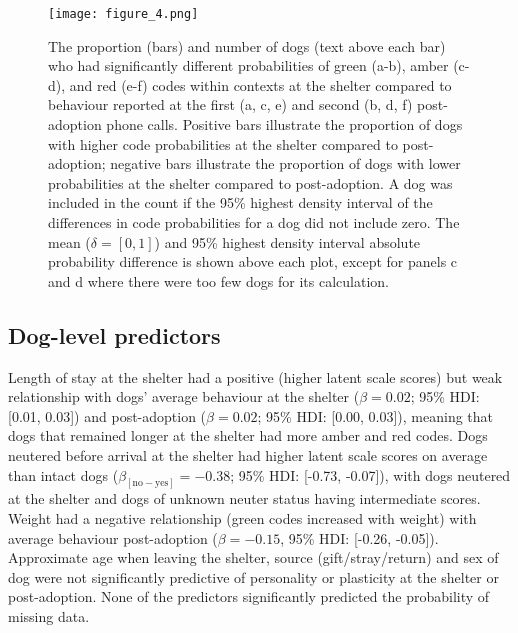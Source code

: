 \documentclass[fleqn,10pt]{wlscirep}
\begin{document}
\begin{figure}[t!]
  \centering
  \texttt{[image: figure\_4.png]}
  \caption{The proportion (bars) and number of dogs (text above each bar) who had significantly different probabilities of green (a-b), amber (c-d), and red (e-f) codes within contexts at the shelter compared to behaviour reported at the first (a, c, e) and second (b, d, f) post-adoption phone calls. Positive bars illustrate the proportion of dogs with higher code probabilities at the shelter compared to post-adoption; negative bars illustrate the proportion of dogs with lower probabilities at the shelter compared to post-adoption. A dog was included in the count if the 95\% highest density interval of the differences in code probabilities for a dog did not include zero. The mean ($\delta = [0,1]$) and 95\% highest density interval absolute probability difference is shown above each plot, except for panels c and d where there were too few dogs for its calculation.}
  \label{fig_num_dogs}
\end{figure}

\subsection*{Dog-level predictors}
Length of stay at the shelter had a positive (higher latent scale scores) but weak relationship with dogs' average behaviour at the shelter ($\beta = 0.02$; 95\% HDI: [0.01, 0.03]) and post-adoption ($\beta = 0.02$; 95\% HDI: [0.00, 0.03]), meaning that dogs that remained longer at the shelter had more amber and red codes. Dogs neutered before arrival at the shelter had higher latent scale scores on average than intact dogs ($\beta_{[\text{no}-\text{yes}]} = -0.38$; 95\% HDI: [-0.73, -0.07]), with dogs neutered at the shelter and dogs of unknown neuter status having intermediate scores. Weight had a negative relationship (green codes increased with weight) with average behaviour post-adoption ($\beta = -0.15$, 95\% HDI: [-0.26, -0.05]). Approximate age when leaving the shelter, source (gift/stray/return) and sex of dog were not significantly predictive of personality or plasticity at the shelter or post-adoption. None of the predictors significantly predicted the probability of missing data.
\end{document}
